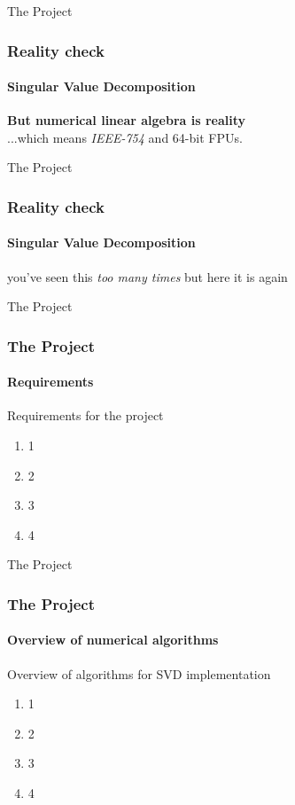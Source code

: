 \documentclass{beamer}
\begin{document}

\begin{frame}{The Project}

\frametitle{Reality check}
\framesubtitle{Singular Value Decomposition}

\textbf{But numerical linear algebra is reality}\\...which means \emph{IEEE-754} and
64-bit FPUs.

\end{frame}


\begin{frame}{The Project}

\frametitle{Reality check}
\framesubtitle{Singular Value Decomposition}

you've seen this \emph{too many times} but here it is again

\end{frame}


\begin{frame}{The Project}

\frametitle{The Project}
\framesubtitle{Requirements}

Requirements for the project
\begin{enumerate}
\item 1
\item 2
\item 3
\item 4
\end{enumerate}

\end{frame}


\begin{frame}{The Project}

\frametitle{The Project}
\framesubtitle{Overview of numerical algorithms}

Overview of algorithms for SVD implementation
\begin{enumerate}
\item 1
\item 2
\item 3
\item 4
\end{enumerate}

\end{frame}
\end{document}
